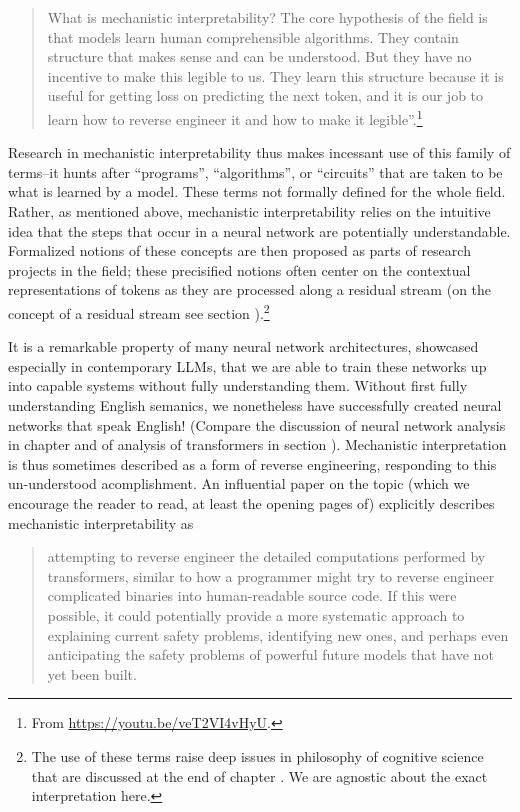 \begin{quote}
What is mechanistic interpretability? The core hypothesis of the field is that
models learn human comprehensible algorithms. They contain structure that makes
sense and can be understood. But they have no incentive to make this legible to
us. They learn this structure because it is useful for getting loss on
predicting the next token, and it is our job to learn how to reverse engineer
it and how to make it
legible''.\footnote{From \url{https://youtu.be/veT2VI4vHyU}.}
\end{quote}

Research in mechanistic interpretability thus makes incessant use of this
family of terms--it hunts after ``programs'', ``algorithms'', or ``circuits''
that are taken to be what is learned by a model. These terms not formally
defined for the whole field. Rather, as mentioned above, mechanistic
interpretability relies on the intuitive idea that the steps that occur in a
neural network are potentially understandable. Formalized notions of these
concepts are then proposed as parts of research projects in the field; these
precisified notions often center on the contextual representations of tokens as
they are processed along a residual stream (on the concept of a residual stream
see section ).\footnote{The use of these terms raise
deep issues in philosophy of cognitive science that are discussed at the end of
chapter .  We are agnostic about the exact
interpretation here.}

It is a remarkable property of many neural network architectures, showcased
especially in contemporary LLMs, that we are able to train these networks up
into capable systems without fully understanding them. Without first fully
understanding English semanics, we nonetheless have successfully created neural
networks that speak English! (Compare the discussion of neural network analysis
in chapter  and of analysis of transformers in section
). Mechanistic interpretation is thus sometimes described as
a form of reverse engineering, responding to this un-understood acomplishment.
An influential paper on the topic (which we encourage the reader to read, at
least the opening pages of) explicitly describes mechanistic interpretability
as

\begin{quote}
attempting to reverse engineer the detailed computations performed by
transformers, similar to how a programmer might try to reverse engineer
complicated binaries into human-readable source code.  If this were possible,
it could potentially provide a more systematic approach to explaining current
safety problems, identifying new ones, and perhaps even anticipating the safety
problems of powerful future models that have not yet been
built.\cite{elhage2021mathematical} 
\end{quote}

